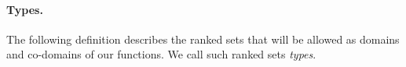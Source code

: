  
%
%









\paragraph*{Types.} The following definition describes the  ranked sets that will be allowed as domains and co-domains of our functions.  We call such ranked sets \emph{types}.



